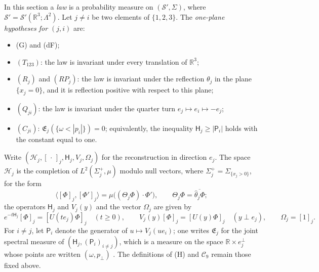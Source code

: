 \documentclass[11pt,letterpaper,reqno]{amsart}
\theoremstyle{definition}
\begin{document}
In this section a \emph{law} is a probability measure on $(\mathcal S',\Sigma)$, where $\mathcal S'=\mathcal S'(\mathbb R^3;\Lambda^2)$.
Let $j\ne i$ be two elements of $\{1,2,3\}$.
The \emph{one-plane hypotheses for $(j,i)$} are:
\begin{itemize}
\item (G) and (dF);
\item $(T_{123})$: the law is invariant under every translation of $\mathbb R^3$;
\item $(R_j)$ and $(RP_j)$: the law is invariant under the reflection $\theta_j$ in the plane $\{x_j=0\}$, and it is reflection positive with respect to this plane;
\item $(Q_{ji})$: the law is invariant under the quarter turn $e_j\mapsto e_i\mapsto-e_j$;
\item $(C_{ji})$: $\mathfrak E_j(\{\omega<|p_i|\})=0$; equivalently, the inequality $\mathsf H_j\ge|\mathsf P_i|$ holds with the constant equal to one.
\end{itemize}
Write $(\mathcal H_j,[\,\cdot\,]_j,\mathsf H_j,V_j,\Omega_j)$ for the reconstruction in direction $e_j$.
The space $\mathcal H_j$ is the completion of $L^2(\Sigma_j^+,\mu)$ modulo null vectors, where $\Sigma_j^+=\Sigma_{\{x_j>0\}}$, for the form
\begin{equation*}
\langle[\Phi]_j,[\Phi']_j\rangle=\mu\big((\Theta_j\Phi)\cdot\Phi'\big),\qquad\Theta_j\Phi=\overline{\hat\theta_j\Phi};
\end{equation*}
the operators $\mathsf H_j$ and $V_j(y)$ and the vector $\Omega_j$ are given by
\begin{equation*}
e^{-t\mathsf H_j}[\Phi]_j=[U(te_j)\Phi]_j\quad(t\ge0),\qquad V_j(y)[\Phi]_j=[U(y)\Phi]_j\quad(y\perp e_j),\qquad\Omega_j=[1]_j.
\end{equation*}
For $i\ne j$, let $\mathsf P_i$ denote the generator of $u\mapsto V_j(ue_i)$; one writes $\mathfrak E_j$ for the joint spectral measure of $(\mathsf H_j,(\mathsf P_i)_{i\ne j})$, which is a measure on the space $\mathbb R\times e_j^\perp$ whose points are written $(\omega,p_\perp)$ \cite[Proposition~7.2]{QEDConstruction}.
The definitions of (H) and $\mathcal C_9$ remain those fixed above.
\end{document}
